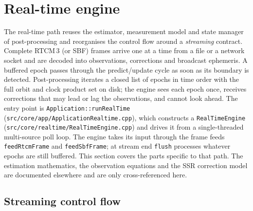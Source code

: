 \documentclass[main.tex]{subfiles}
\begin{document}

\section{Real-time engine}\label{sec:rt}

The real-time path reuses the estimator, measurement model and state
manager of post-processing and reorganises the control flow around a
\emph{streaming} contract.  Complete RTCM\,3 (or SBF) frames arrive one
at a time from a file or a network socket and are decoded into
observations, corrections and broadcast ephemeris.  A buffered epoch
passes through the  predict/update cycle as
soon as its boundary is detected.  Post-processing iterates a closed
list of epochs in time order with the full orbit and clock product set
on disk; the engine sees each epoch once, receives corrections that may
lead or lag the observations, and cannot look ahead.  The entry point is
\texttt{Application::runRealTime} (\texttt{src/core/app/Application\-Realtime.cpp}),
which constructs a \texttt{RealTimeEngine}
(\texttt{src/core/realtime/RealTimeEngine.cpp}) and drives it from a
single-threaded multi-source poll loop.  The engine takes its input
through the frame feeds \texttt{feedRtcmFrame} and \texttt{feedSbfFrame};
at stream end \texttt{flush} processes whatever epochs are still
buffered.  This section covers the parts specific to that path.  The estimation mathematics, the observation
equations and the SSR correction model are documented elsewhere and are
only cross-referenced here.

\subsection{Streaming control flow}\label{sec:rt-flow}
\end{document}
